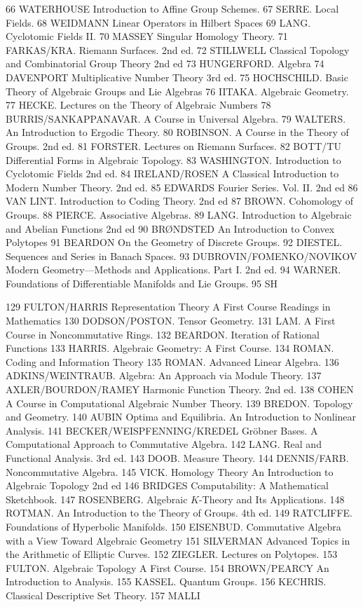 66 WATERHOUSE Introduction to Affine Group Schemes.
67 SERRE. Local Fields.
68 WEIDMANN Linear Operators in Hilbert Spaces
69 LANG. Cyclotomic Fields II.
70 MASSEY Singular Homology Theory.
71 FARKAS/KRA. Riemann Surfaces. 2nd ed.
72 STILLWELL Classical Topology and Combinatorial Group Theory 2nd ed
73 HUNGERFORD. Algebra
74 DAVENPORT Multiplicative Number Theory 3rd ed.
75 HOCHSCHILD. Basic Theory of Algebraic Groups and Lie Algebras
76 IITAKA. Algebraic Geometry.
77 HECKE. Lectures on the Theory of Algebraic Numbers
78 BURRIS/SANKAPPANAVAR. A Course in Universal Algebra.
79 WALTERS. An Introduction to Ergodic Theory.
80 ROBINSON. A Course in the Theory of Groups. 2nd ed.
81 FORSTER. Lectures on Riemann Surfaces.
82 BOTT/TU Differential Forms in Algebraic Topology.
83 WASHINGTON. Introduction to Cyclotomic Fields 2nd ed.
84 IRELAND/ROSEN A Classical Introduction to Modern Number Theory. 2nd ed.
85 EDWARDS Fourier Series. Vol. II. 2nd ed
86 VAN LINT. Introduction to Coding Theory. 2nd ed
87 BROWN. Cohomology of Groups.
88 PIERCE. Associative Algebras.
89 LANG. Introduction to Algebraic and Abelian Functions 2nd ed
90 BRØNDSTED An Introduction to Convex Polytopes
91 BEARDON On the Geometry of Discrete Groups.
92 DIESTEL. Sequences and Series in Banach Spaces.
93 DUBROVIN/FOMENKO/NOVIKOV Modern Geometry—Methods and Applications. Part I. 2nd ed.
94 WARNER. Foundations of Differentiable Manifolds and Lie Groups.
95 SH

129 FULTON/HARRIS Representation Theory
A First Course
Readings in Mathematics
130 DODSON/POSTON. Tensor Geometry.
131 LAM. A First Course in Noncommutative Rings.
132 BEARDON. Iteration of Rational Functions
133 HARRIS. Algebraic Geometry: A First Course.
134 ROMAN. Coding and Information Theory
135 ROMAN. Advanced Linear Algebra.
136 ADKINS/WEINTRAUB. Algebra: An Approach via Module Theory.
137 AXLER/BOURDON/RAMEY Harmonic Function Theory. 2nd ed.
138 COHEN A Course in Computational Algebraic Number Theory.
139 BREDON. Topology and Geometry.
140 AUBIN Optima and Equilibria. An Introduction to Nonlinear Analysis.
141 BECKER/WEISPFENNING/KREDEL Gröbner Bases. A Computational Approach to Commutative Algebra.
142 LANG. Real and Functional Analysis. 3rd ed.
143 DOOB. Measure Theory.
144 DENNIS/FARB. Noncommutative Algebra.
145 VICK. Homology Theory An Introduction to Algebraic Topology 2nd ed
146 BRIDGES Computability: A Mathematical Sketchbook.
147 ROSENBERG. Algebraic $K$-Theory and Its Applications.
148 ROTMAN. An Introduction to the Theory of Groups. 4th ed.
149 RATCLIFFE. Foundations of Hyperbolic Manifolds.
150 EISENBUD. Commutative Algebra with a View Toward Algebraic Geometry
151 SILVERMAN Advanced Topics in the Arithmetic of Elliptic Curves.
152 ZIEGLER. Lectures on Polytopes.
153 FULTON. Algebraic Topology A First Course.
154 BROWN/PEARCY An Introduction to Analysis.
155 KASSEL. Quantum Groups.
156 KECHRIS. Classical Descriptive Set Theory.
157 MALLI

